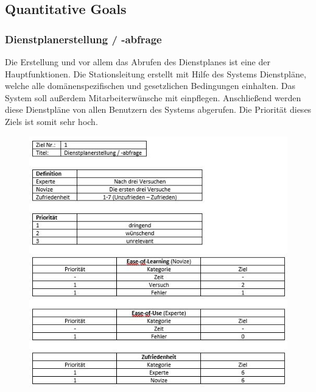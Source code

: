 \documentclass[11pt,
paper=a4,
bibtotocnumbered,	  %
liststotocnumbered,  %
DIV=calc,		  %
tablecaptionabove,	  %
headinclude,
]{article}
\begin{document}
\subsection{Quantitative Goals}
\subsubsection{Dienstplanerstellung / -abfrage}
Die Erstellung und vor allem das Abrufen des Dienstplanes ist eine der Hauptfunktionen. Die Stationsleitung erstellt mit Hilfe des Systems Dienstpläne, welche alle domänenspezifischen und gesetzlichen Bedingungen einhalten. Das System soll außerdem Mitarbeiterwünsche mit einpflegen. Anschließend werden diese Dienstpläne von allen Benutzern des Systems abgerufen. Die Priorität dieses Ziels ist somit sehr hoch.
\begin{figure}[H]
\includegraphics[width=1\textwidth]{Bilder/dienstplanAbfrage.jpg}
\end{figure}
\end{document}
